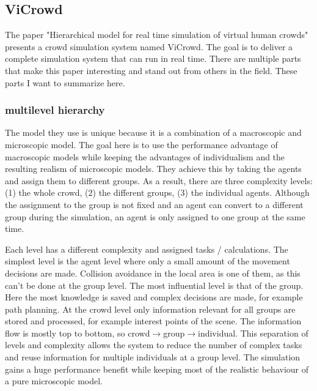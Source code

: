 \documentclass{acmsiggraph}               %
\begin{document}
\subsection{ViCrowd}

The paper "Hierarchical model for real time simulation of virtual human crowds" \cite{musse_hierarchical_2001} presents a crowd simulation system named ViCrowd. 
The goal is to deliver a complete simulation system that can run in real time. 
There are multiple parts that make this paper interesting and stand out from others in the field. These parts I want to summarize here. 

\subsubsection{multilevel hierarchy}
The model they use is unique because it is a combination of a macroscopic and microscopic model. The goal here is to use the performance advantage of macroscopic models while keeping the advantages of individualism and the resulting realism of microscopic models.
They achieve this by taking the agents and assign them to different groups. As a result, there are three complexity levels: (1) the whole crowd, (2) the different groups, (3) the individual agents. Although the assignment to the group is not fixed and an agent can convert to a different group during the simulation, an agent is only assigned to one group at the same time.

Each level has a different complexity and assigned tasks / calculations. 
The simplest level is the agent level where only a small amount of the movement decisions are made. Collision avoidance in the local area is one of them, as this can't be done at the group level.
The most influential level is that of the group. Here the most knowledge is saved and complex decisions are made, for example path planning.
At the crowd level only information relevant for all groups are stored and processed, for example interest points of the scene.
The information flow is mostly top to bottom, so crowd$\rightarrow$group$\rightarrow$individual.
This separation of levels and complexity allows the system to reduce the number of complex tasks and reuse information for multiple individuals at a group level. The simulation gains a huge performance benefit while keeping most of the realistic behaviour of a pure microscopic model. 
\end{document}
